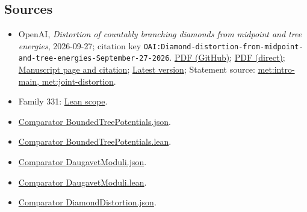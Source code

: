 \documentclass[11pt]{article}
\begin{document}
\subsection{Sources}
\begin{itemize}
\item OpenAI, \emph{Distortion of countably branching diamonds from midpoint and tree energies}, 2026-09-27; citation key \texttt{OAI:Diamond-distortion-from-midpoint-and-tree-energies-September-27-2026}. \href{https://github.com/openai/math/blob/adc7f1241b42e322a6451854ab7e4b4c146bf78a/preprints/Diamond-distortion-from-midpoint-and-tree-energies-September-27-2026/manuscript.pdf}{PDF (GitHub)}; \href{https://github.com/openai/math/raw/adc7f1241b42e322a6451854ab7e4b4c146bf78a/preprints/Diamond-distortion-from-midpoint-and-tree-energies-September-27-2026/manuscript.pdf}{PDF (direct)}; \href{https://github.com/openai/math/blob/adc7f1241b42e322a6451854ab7e4b4c146bf78a/preprints/Diamond-distortion-from-midpoint-and-tree-energies-September-27-2026/README.md}{Manuscript page and citation}; \href{https://github.com/openai/math/blob/main/preprints/Diamond-distortion-from-midpoint-and-tree-energies-September-27-2026/manuscript.pdf}{Latest version}; Statement source: \href{https://github.com/openai/math/blob/adc7f1241b42e322a6451854ab7e4b4c146bf78a/preprints/Diamond-distortion-from-midpoint-and-tree-energies-September-27-2026/build/sections/introduction.tex\#L53}{met:intro-main, met:joint-distortion}.
\item Family 331: \href{https://github.com/openai/math/blob/adc7f1241b42e322a6451854ab7e4b4c146bf78a/lean/docs/331.md}{Lean scope}.
\item \href{https://github.com/openai/math/blob/adc7f1241b42e322a6451854ab7e4b4c146bf78a/lean/ComparatorChallenges/BoundedTreePotentials.json}{Comparator BoundedTreePotentials.json}.
\item \href{https://github.com/openai/math/blob/adc7f1241b42e322a6451854ab7e4b4c146bf78a/lean/ComparatorChallenges/BoundedTreePotentials.lean}{Comparator BoundedTreePotentials.lean}.
\item \href{https://github.com/openai/math/blob/adc7f1241b42e322a6451854ab7e4b4c146bf78a/lean/ComparatorChallenges/DaugavetModuli.json}{Comparator DaugavetModuli.json}.
\item \href{https://github.com/openai/math/blob/adc7f1241b42e322a6451854ab7e4b4c146bf78a/lean/ComparatorChallenges/DaugavetModuli.lean}{Comparator DaugavetModuli.lean}.
\item \href{https://github.com/openai/math/blob/adc7f1241b42e322a6451854ab7e4b4c146bf78a/lean/ComparatorChallenges/DiamondDistortion.json}{Comparator DiamondDistortion.json}.

\end{itemize}
\end{document}
